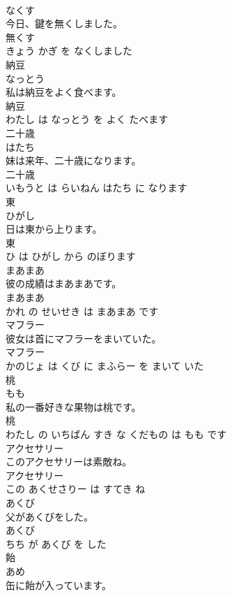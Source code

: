 \documentclass[8pt]{extreport}
\begin{document}
\begin{CJK}{UTF8}{min}
\\	なくす			
\\	今日、鍵を無くしました。	
\\	無くす 
\\	きょう かぎ を なくしました			
\\	納豆	
\\	なっとう			
\\	私は納豆をよく食べます。	
\\	納豆 
\\	わたし は なっとう を よく たべます			
\\	二十歳	
\\	はたち			
\\	妹は来年、二十歳になります。	
\\	二十歳 
\\	いもうと は らいねん はたち に なります			
\\	東	
\\	ひがし			
\\	日は東から上ります。	
\\	東 
\\	ひ は ひがし から のぼります			
\\	まあまあ	
\\	彼の成績はまあまあです。	
\\	まあまあ 
\\	かれ の せいせき は まあまあ です			
\\	マフラー	
\\	彼女は首にマフラーをまいていた。	
\\	マフラー 
\\	かのじょ は くび に まふらー を まいて いた			
\\	桃	
\\	もも			
\\	私の一番好きな果物は桃です。	
\\	桃 
\\	わたし の いちばん すき な くだもの は もも です			
\\	アクセサリー	
\\	このアクセサリーは素敵ね。	
\\	アクセサリー 
\\	この あくせさりー は すてき ね			
\\	あくび	
\\	父があくびをした。	
\\	あくび 
\\	ちち が あくび を した			
\\	飴	
\\	あめ			
\\	缶に飴が入っています。	

\end{CJK}
\end{document}
